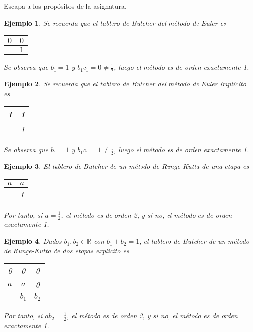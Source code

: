 \documentclass[11pt]{report}
\makeatletter
\renewenvironment{proof}[1][\proofname]{\par
  \pushQED{\qed}%
  \normalfont \topsep\z@skip %
  \trivlist
  \item[\hskip\labelsep
        \itshape
    #1\@addpunct{.}]\ignorespaces
}{%
  \popQED\endtrivlist\@endpefalse
}
\theoremstyle{mytheorem}
\theoremstyle{mydefinition}
\theoremstyle{myexample}
\newtheorem*{example}{Ejemplo}
\let\oldproofname=\proofname
\renewcommand{\proofname}{\rm\bf{\oldproofname}}}
\newcommand{\R}{\mathbb R}
\makeatother
\begin{document}
\begin{proof}
Escapa a los propósitos de la asignatura.
\end{proof}

\begin{example}
Se recuerda que el tablero de Butcher del método de Euler es
\begin{center}
\setlength\extrarowheight{2.5pt}
\begin{tabular}{c|c}
    $0$ & $0$ \\ \hline
    & $1$
\end{tabular}
\end{center}
Se observa que $b_1 = 1$ y $b_1c_1=0 \neq \frac{1}{2}$, luego el método es de orden exactamente 1.
\end{example}

\begin{example}
Se recuerda que el tablero de Butcher del método de Euler implícito es
\begin{center}
\setlength\extrarowheight{2.5pt}
\begin{tabular}{c|c}
    1 & 1\\ \hline
    & 1
\end{tabular}
\end{center}
Se observa que $b_1 = 1$ y $b_1c_1 = 1 \neq \frac{1}{2}$, luego el método es de orden exactamente 1.
\end{example}

\begin{example}
El tablero de Butcher de un método de Runge-Kutta de una etapa es
\begin{center}
\setlength\extrarowheight{2.5pt}
\begin{tabular}{c|c}
    $a$ & $a$\\ \hline
    & 1
\end{tabular}
\end{center}
Por tanto, si $a = \frac{1}{2}$, el método es de orden 2, y si no, el método es de orden exactamente 1.
\end{example}

\begin{example}
Dados $b_1,b_2 \in \R$ con $b_1+b_2 =1$, el tablero de Butcher de un método de Runge-Kutta de dos etapas explícito es
\begin{center}
\setlength\extrarowheight{2.5pt}
\begin{tabular}{c|cc}
    0 & 0 & 0\\
    $a$ & $a$ & 0 \\ \hline
    & $b_1$ & $b_2$
\end{tabular}
\end{center}
Por tanto, si $ab_2 = \frac{1}{2}$, el método es de orden 2, y si no, el método es de orden exactamente 1.
\end{example}
\end{document}
